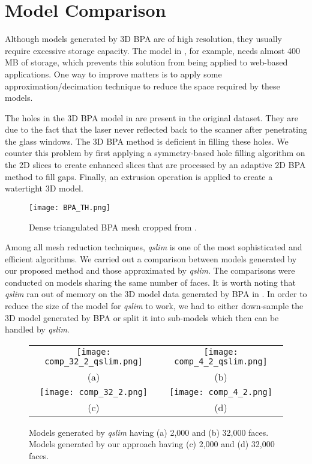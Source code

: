 \section{Model Comparison}
\label{sec:pf_mc}

Although models generated by 3D BPA are of high resolution, they usually
require excessive storage capacity.
The model in , for example, needs almost 400 MB of storage,
which prevents this solution from being applied to web-based applications.
One way to improve matters is to apply some approximation/decimation
technique to reduce the space required by these models.

The holes in the 3D BPA model in  are present in the
original dataset.
They are due to the fact that the laser never reflected back to
the scanner after penetrating the glass windows.
The 3D BPA method is deficient in filling these holes.
We counter this problem by first applying a symmetry-based hole filling
algorithm on the 2D slices to create enhanced slices that are processed
by an adaptive 2D BPA method to fill gaps.
Finally, an extrusion operation is applied to create a watertight 3D model.

\begin{figure}[htbp]
\begin{center}
\texttt{[image: BPA\_TH.png]}
\end{center}
\caption{Dense triangulated BPA mesh cropped from .}
\label{fig:TH_BPA}
\end{figure}

Among all mesh reduction techniques, {\it qslim} is one of the most
sophisticated and efficient algorithms.
We carried out a comparison between models generated by our proposed
method and those approximated by {\it qslim}.
The comparisons were conducted on models sharing the same number of faces.
It is worth noting that {\it qslim} ran out of memory on the 3D model data
generated by BPA in .
In order to reduce the size of the model for {\it qslim} to work, we had
to either down-sample the 3D model generated by BPA or split it into
sub-models which then can be handled by {\it qslim}.

\begin{figure}[htbp]
\begin{center}
\begin{tabular}{cc}
\texttt{[image: comp\_32\_2\_qslim.png]} &
\texttt{[image: comp\_4\_2\_qslim.png]} \\
(a) & (b) \\
\texttt{[image: comp\_32\_2.png]} &
\texttt{[image: comp\_4\_2.png]} \\
(c) & (d)
\end{tabular}
\end{center}
\caption{
Models generated by {\it qslim} having (a) 2,000 and (b) 32,000 faces.
Models generated by our approach having (c) 2,000 and (d) 32,000 faces.}
\label{fig:TH_comp}
\end{figure}

